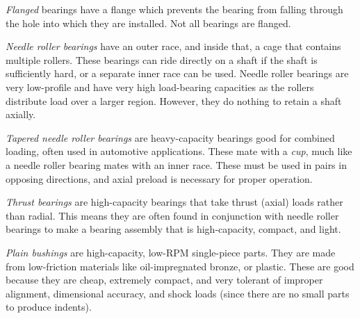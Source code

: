 \documentclass[10pt,letterpaper]{book}
\begin{document}
\begin{asparaenum}[a)]
\begin{asparaitem}[\ \ \ ]
			\item \textit{Flanged} bearings have a flange which prevents the bearing from falling through the hole into which they are installed. Not all bearings are flanged.
		\end{asparaitem}
		\item \textit{Needle roller bearings} have an outer race, and inside that, a cage that contains multiple rollers. These bearings can ride directly on a shaft if the shaft is sufficiently hard, or a separate inner race can be used. Needle roller bearings are very low-profile and have very high load-bearing capacities as the rollers distribute load over a larger region. However, they do nothing to retain a shaft axially.
		\item \textit{Tapered needle roller bearings} are heavy-capacity bearings good for combined loading, often used in automotive applications. These mate with a \textit{cup}, much like a needle roller bearing mates with an inner race. These must be used in pairs in opposing directions, and axial preload is necessary for proper operation.
		\item \textit{Thrust bearings} are high-capacity bearings that take thrust (axial) loads rather than radial. This means they are often found in conjunction with needle roller bearings to make a bearing assembly that is high-capacity, compact, and light.
		\item \textit{Plain bushings} are high-capacity, low-RPM single-piece parts. They are made from low-friction materials like oil-impregnated bronze, or plastic. These are good because they are cheap, extremely compact, and very tolerant of improper alignment, dimensional accuracy, and shock loads (since there are no small parts to produce indents).
	\end{asparaenum}
	
\end{document}
